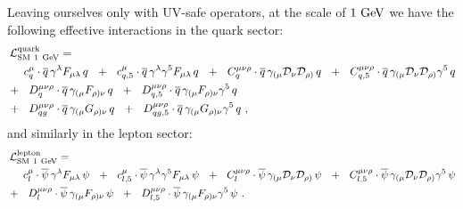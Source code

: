 \documentclass[12pt,preprintnumbers,nofootinbib]{revtex4}
\newcommand{\ov}{\overline}
\newcommand{\md}{\mathcal{D}}
\newcommand{\GeV}{{\rm GeV}}
\begin{document}
	Leaving ourselves only with UV-safe operators, 
	at the scale of $ 1~\GeV $ we 
	have the following effective interactions in the quark sector:
\begin{align}
\nonumber
	\mathcal{L}_{\rm SM\ 1~GeV}^{\rm quark} = \hspace{-2.0cm}&
	\\
\nonumber
	&
	\phantom{+~~}
	c_{q}^\mu \cdot
	\ov{q}\, \gamma^\lambda F_{\mu\lambda}\, q 
	~~+~~
	c_{q,5}^\mu \cdot
	\ov{q}\, \gamma^\lambda \gamma^5 F_{\mu\lambda}\, q 
	~~+~~
	C_q^{\mu\nu\rho} \cdot
	\ov{q}\, \gamma_{(\mu} \md_\nu \md_{\rho)}\, q
	~~+~~
	C_{q,5}^{\mu\nu\rho} \cdot
	\ov{q}\, \gamma_{(\mu} \md_\nu \md_{\rho)}\gamma^5\, q
	\\
\label{SM_quark_1GeV}
	&
	+~~
	D_{q}^{\mu\nu\rho} \cdot
	\ov{q}\, \gamma_{(\mu} F_{\rho)\nu}\, q
	~~+~~
	D_{q,5}^{\mu\nu\rho} \cdot
	\ov{q}\, \gamma_{(\mu} F_{\rho)\nu}\gamma^5\, q
	\\
\nonumber
	&
	+~~
	D_{qg}^{\mu\nu\rho} \cdot
	\ov{q}\, \gamma_{(\mu} G_{\rho)\nu}\, q
	~~+~~
	D_{qg,5}^{\mu\nu\rho} \cdot
	\ov{q}\, \gamma_{(\mu} G_{\rho)\nu}\gamma^5\, q
	~,
\end{align}
	and similarly in the lepton sector:
\begin{align}
\nonumber
	\mathcal{L}_{\rm SM\ 1~GeV}^{\rm lepton} = \hspace{-2.0cm}&
	\\
\nonumber
	&
	\phantom{+~~}
	c_l^\mu \cdot
	\ov{\psi}\, \gamma^{\lambda} F_{\mu\lambda}\, \psi
	~~+~~
	c_{l,5}^\mu \cdot
	\ov{\psi}\, \gamma^{\lambda}\gamma^5 F_{\mu\lambda}\, \psi
	~~+~~
	C_l^{\mu\nu\rho} \cdot
	\ov{\psi}\, \gamma_{(\mu} \md_\nu \md_{\rho)}\, \psi
	~~+~~
	C_{l,5}^{\mu\nu\rho} \cdot
	\ov{\psi}\, \gamma_{(\mu} \md_\nu \md_{\rho)}\gamma^5\, \psi
	\\
\label{SM_lepton_1GeV}
	&
	+~~
	D_{l}^{\mu\nu\rho} \cdot
	\ov{\psi}\, \gamma_{(\mu} F_{\rho)\nu}\, \psi
	~~+~~
	D_{l,5}^{\mu\nu\rho} \cdot
	\ov{\psi}\, \gamma_{(\mu} F_{\rho)\nu}\gamma^5\, \psi
	~.
\end{align}
\end{document}
